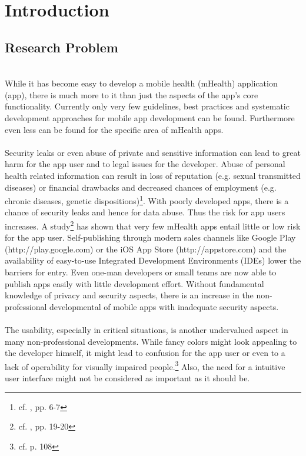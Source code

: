 \section{Introduction}
\subsection{Research Problem}
\\
While it has become easy to develop a mobile health (mHealth) application (app), there is much more to it than just the aspects of the app's core functionality. Currently only very few guidelines, best practices and systematic development approaches for mobile app development can be found. Furthermore even less can be found for the specific area of mHealth apps.
\\
\\
Security leaks or even abuse of private and sensitive information can lead to great harm for the app user and to legal issues for the developer. Abuse of personal health related information can result in loss of reputation (e.g. sexual transmitted diseases) or financial drawbacks and decreased chances of employment (e.g. chronic diseases, genetic dispositions)\footnote{cf. \cite{Dehling.2013}, pp. 6-7}. With poorly developed apps, there is a chance of security leaks and hence for data abuse. Thus the risk for app users increases. A study\footnote{cf. \cite{Njie.2013}, pp. 19-20} has shown that very few mHealth apps entail little or low risk for the app user. Self-publishing through modern sales channels like Google Play (http://play.google.com) or the iOS App Store (http://appstore.com) and the availability of easy-to-use Integrated Development Environments (IDEs) lower the barriers for entry. Even one-man developers or small teams are now able to publish apps easily with little development effort. Without fundamental knowledge of privacy and security aspects, there is an increase in the non-professional developmental of mobile apps with inadequate security aspects.
\\
\\
The usability, especially in critical situations, is another undervalued aspect in many non-professional developments. While fancy colors might look appealing to the developer himself, it might lead to confusion for the app user or even to a lack of operability for visually impaired people.\footnote{cf. \cite{Badashian.2008} p. 108} Also, the need for a intuitive user interface might not be considered as important as it should be.
\\
